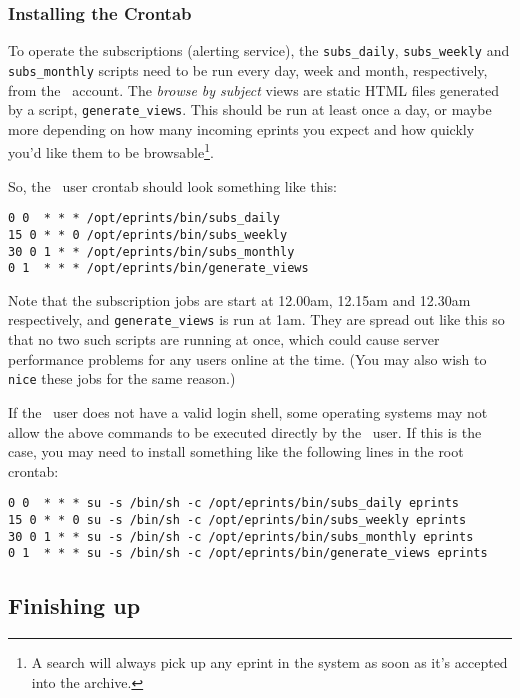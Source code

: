\subsubsection{Installing the Crontab}
\label{manual_crontab}

To operate the subscriptions (alerting service), the {\tt subs\_daily}, {\tt subs\_weekly} and {\tt subs\_monthly} scripts need to be run every day, week and month, respectively, from the \eprints\ account. The \emph{browse by subject} views are static HTML files generated by a script, {\tt generate\_views}. This should be run at least once a day, or maybe more depending on how many incoming eprints you expect and how quickly you'd like them to be browsable\footnote{A search will always pick up any eprint in the system as soon as it's accepted into the archive.}.

So, the \eprints\ user crontab should look something like this:

\begin{verbatim}
0 0  * * * /opt/eprints/bin/subs_daily
15 0 * * 0 /opt/eprints/bin/subs_weekly
30 0 1 * * /opt/eprints/bin/subs_monthly
0 1  * * * /opt/eprints/bin/generate_views
\end{verbatim}

Note that the subscription jobs are start at 12.00am, 12.15am and 12.30am respectively, and {\tt generate\_views} is run at 1am. They are spread out like this so that no two such scripts are running at once, which could cause server performance problems for any users online at the time. (You may also wish to {\tt nice} these jobs for the same reason.)

If the \eprints\ user does not have a valid login shell, some operating systems may not allow the above commands to be executed directly by the \eprints\ user. If this is the case, you may need to install something like the following lines in the root crontab:

\begin{verbatim}
0 0  * * * su -s /bin/sh -c /opt/eprints/bin/subs_daily eprints
15 0 * * 0 su -s /bin/sh -c /opt/eprints/bin/subs_weekly eprints
30 0 1 * * su -s /bin/sh -c /opt/eprints/bin/subs_monthly eprints
0 1  * * * su -s /bin/sh -c /opt/eprints/bin/generate_views eprints
\end{verbatim}


\subsection{Finishing up}
\label{finishing_up}

